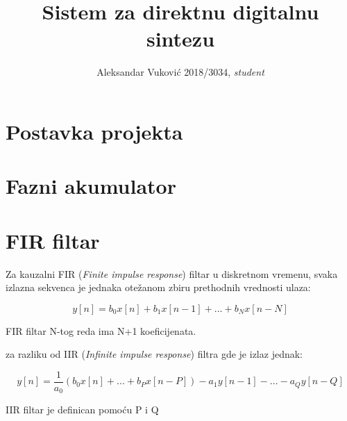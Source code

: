 \documentclass[journal,twocolumn,letterpaper]{IEEEJERM}
\begin{document}
\title{Sistem za direktnu digitalnu sintezu}

\author{Aleksandar Vuković 2018/3034, \textit{student}}

{}


\IEEEpeerreviewmaketitle



\section{Postavka projekta}


\section{Fazni akumulator}


\section{FIR filtar}

Za kauzalni FIR (\textit{Finite impulse response}) filtar u diskretnom vremenu, svaka izlazna sekvenca je jednaka otežanom zbiru prethodnih vrednosti ulaza:

\begin{equation}
y[n] = b_0 x[n] + b_1 x[n-1] + ... + b_N x[n-N]
\end{equation}

FIR filtar N-tog reda ima N+1 koeficijenata.

za razliku od IIR (\textit{Infinite impulse response}) filtra gde je izlaz jednak:

\begin{equation}
y[n] =\dfrac{1}{a_0} (b_0 x[n] + ... + b_P x[n-P]) - a_1 y[n-1] - ... - a_Q y[n-Q]
\end{equation}

IIR filtar je definican pomoću P i Q
\end{document}
